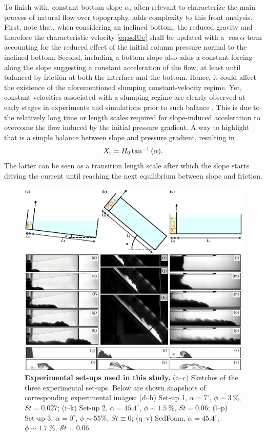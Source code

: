 \documentclass[12pt]{article}
\begin{document}
To finish with, constant bottom slope $\alpha$, often relevant to characterize the main process of natural flow over topography, adds complexity to this front analysis. First, note that, when considering an inclined bottom, the reduced gravity and therefore the characteristic velocity \eqref{eq:solUc} shall be updated with a $\cos{\alpha}$ term accounting for the reduced effect of the initial column pressure normal to the inclined bottom. Second, including a bottom slope also adds a constant forcing along the slope suggesting a constant acceleration of the flow, at least until balanced by friction at both the interface and the bottom. Hence, it could affect the existence of the aforementioned slumping constant-velocity regime.
%
Yet, constant velocities associated with a slumping regime are clearly observed at early stages in experiments and simulations prior to such balance \citep{Birman2007, Gadal2023}. This is due to the relatively long time or length scales required for slope-induced acceleration to overcome the flow induced by the initial pressure gradient. A way to highlight that is a simple balance between slope and pressure gradient, resulting in
\begin{equation}
	\label{eq:Xt_slope}
	X_{\text t}=H_0\tan^{-1}{(\alpha)}.
\end{equation}
The latter can be seen as a transition length scale after which the slope starts driving the current until reaching the next equilibrium between slope and friction.


\begin{figure}[ht!]
	\centering
	\includegraphics{figure1.pdf}
	\caption{\textbf{Experimental set-ups used in this study.} (a--c) Sketches of the three experimental set-ups. Below are shown snapshots of corresponding experimental images: (d--h) Set-up 1, $\alpha = 7^\circ$, $\phi \sim 3~\%$, ${S}t=0.027$; (i--k) Set-up 2, $\alpha = 45.4^\circ$, $\phi \sim 1.5~\%$, ${S}t=0.06 $; (l--p) Set-up 3, $\alpha = 0^\circ$, $\phi \sim 55\%$, ${S}t \equiv 0$; (q--v) SedFoam, $\alpha = 45.4^\circ$, $\phi \sim 1.7~\%$, $\mathcal{S}t=0.06$.}
	\label{fig:fig1}
\end{figure}
\end{document}
